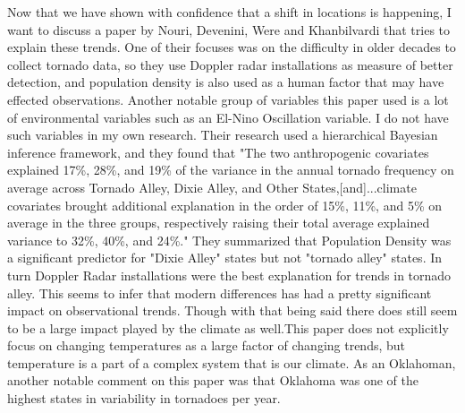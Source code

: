 \documentclass[12pt,english]{article}
\begin{document}
Now that we have shown with confidence that a shift in locations is happening, I want to discuss a paper by Nouri, Devenini, Were and Khanbilvardi that tries to explain these trends. One of their focuses was on the difficulty in older decades to collect tornado data, so they use Doppler radar installations as measure of better detection, and population density is also used as a human factor that may have effected observations. Another notable group of variables this paper used is a lot of environmental variables such as an El-Nino Oscillation variable. I do not have such variables in my own research. Their research used a hierarchical Bayesian inference framework, and they found that "The two anthropogenic covariates explained 17\%, 28\%, and 19\% of the variance in the annual tornado frequency on average across Tornado Alley, Dixie Alley, and Other States,[and]...climate covariates brought additional explanation in the order of 15\%, 11\%, and 5\% on average in the three groups, respectively raising their total average explained variance to 32\%, 40\%, and 24\%."\cite{Nouri2021} They summarized that Population Density was a significant predictor for "Dixie Alley" states but not "tornado alley" states. In turn Doppler Radar installations were the best explanation for trends in tornado alley. This seems to infer that modern differences has had a pretty significant impact on observational trends. Though with that being said there does still seem to be a large impact played by the climate as well.This paper does not explicitly focus on changing temperatures as a large factor of changing trends, but temperature is a part of a complex system that is our climate. As an Oklahoman, another notable comment on this paper was that Oklahoma was one of the highest states in variability in tornadoes per year.\\ 
\end{document}
